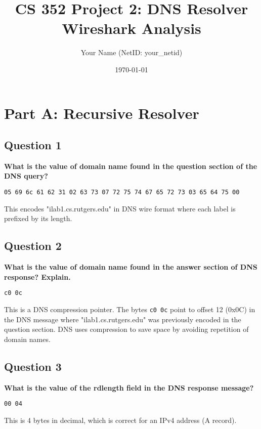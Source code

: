\documentclass[11pt]{article}
\title{CS 352 Project 2: DNS Resolver\\Wireshark Analysis}
\author{Your Name (NetID: your\_netid)}
\date{\today}
\begin{document}
\maketitle

\section*{Part A: Recursive Resolver}

\subsection*{Question 1}
\textbf{What is the value of domain name found in the question section of the DNS query?}

\begin{lstlisting}
05 69 6c 61 62 31 02 63 73 07 72 75 74 67 65 72 73 03 65 64 75 00
\end{lstlisting}

This encodes "ilab1.cs.rutgers.edu" in DNS wire format where each label is prefixed by its length.

\vspace{0.5cm}

\subsection*{Question 2}
\textbf{What is the value of domain name found in the answer section of DNS response? Explain.}

\begin{lstlisting}
c0 0c
\end{lstlisting}

This is a DNS compression pointer. The bytes \texttt{c0 0c} point to offset 12 (0x0C) in the DNS message where "ilab1.cs.rutgers.edu" was previously encoded in the question section. DNS uses compression to save space by avoiding repetition of domain names.

\vspace{0.5cm}

\subsection*{Question 3}
\textbf{What is the value of the rdlength field in the DNS response message?}

\begin{lstlisting}
00 04
\end{lstlisting}

This is 4 bytes in decimal, which is correct for an IPv4 address (A record).
\end{document}
